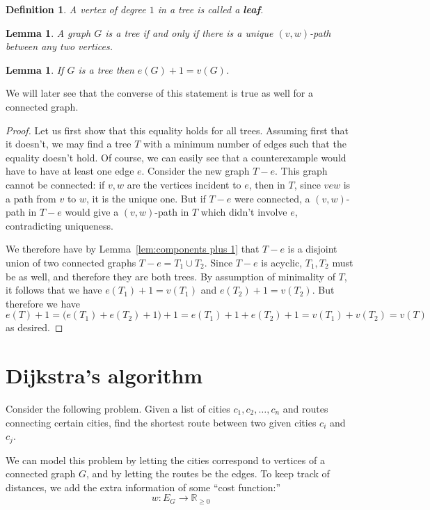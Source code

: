 \documentclass[12pt]{report}
\theoremstyle{plain}
\newtheorem{defn}[thm]{Definition}
\newtheorem{lem}[thm]{Lemma}
\newcommand{\Xb}[1]{\textbf{#1}\index{#1}}
\begin{document}
\begin{defn}
A vertex of degree $1$ in a tree is called a \Xb{leaf}.
\end{defn}


\begin{lem} \label{tree unique path}
A graph $G$ is a tree if and only if there is a unique $(v, w)$-path
between any two vertices.
\end{lem}

\begin{lem} \label{tree count lem}
If $G$ is a tree then $e(G) + 1 = v(G)$.
\end{lem}
We will later see that the converse of this statement is true as well for a
connected graph.
\begin{proof}
Let us first show that this equality holds for all trees. Assuming first
that it doesn't, we may find a tree $T$ with a minimum number of edges such
that the equality doesn't hold. Of course, we can easily see that a
counterexample would have to have at least one edge $e$. Consider the new
graph $T - e$. This graph cannot be connected: if $v, w$ are the vertices
incident to $e$, then in $T$, since $v e w$ is a path from $v$ to $w$, it
is the unique one. But if $T -  e$ were connected, a $(v, w)$-path in $T -
e$ would give a $(v, w)$-path in $T$ which didn't involve $e$,
contradicting uniqueness.

We therefore have by Lemma~\ref{lem:components plus 1} that $T - e$ is a
disjoint union of two connected graphs $T - e = T_1 \cup T_2$. Since $T -
e$ is acyclic, $T_1, T_2$ must be as well, and therefore they are both
trees. By assumption of minimality of $T$, it follows that we have $e(T_1)
+ 1 = v(T_1)$ and $e(T_2) + 1 = v(T_2)$. But therefore we have
\[ e(T) + 1 = \big(e(T_1) + e(T_2) + 1\big) + 1 = e(T_1) + 1 + e(T_2) +
1 = v(T_1) + v(T_2) = v(T) \]
as desired.
\end{proof}

\section{Dijkstra's algorithm}

Consider the following problem. Given a list of cities $c_1, c_2, \ldots,
c_n$ and routes connecting certain cities, find the shortest route between
two given cities $c_i$ and $c_j$.

We can model this problem by letting the cities correspond to vertices of a
connected graph $G$, and by letting the routes be the edges. To keep track of
distances, we add the extra information of some ``cost function:''
\[ w: E_G \to \mathbb R_{\geq 0}\]
\end{document}
